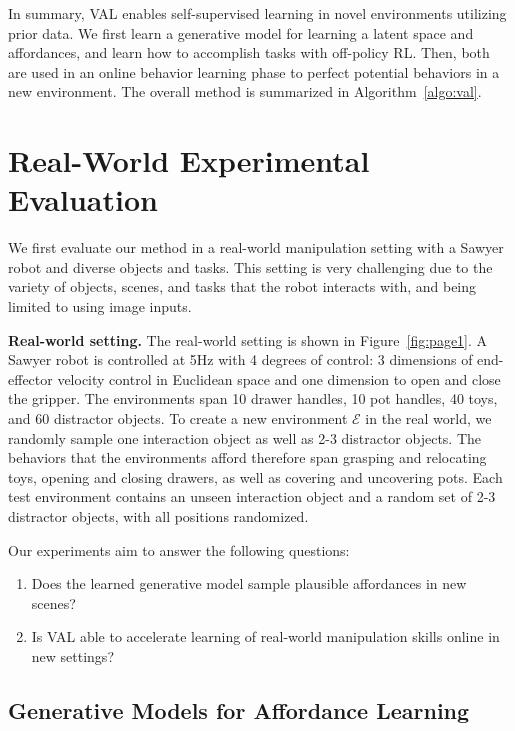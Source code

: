 \documentclass[letterpaper, 10 pt, conference]{ieeeconf}  %
\begin{document}
In summary, VAL enables self-supervised learning in novel environments utilizing prior data. 
We first learn a generative model for learning a latent space and affordances, and learn how to accomplish tasks with off-policy RL. 
Then, both are used in an online behavior learning phase to perfect potential behaviors in a new environment. 
The overall method is summarized in Algorithm~\ref{algo:val}.



\section{Real-World Experimental Evaluation}
\label{sec:result}

We first evaluate our method in a real-world manipulation setting with a Sawyer robot and diverse objects and tasks. This setting is very challenging due to the variety of objects, scenes, and tasks that the robot interacts with, and being limited to using image inputs.

\textbf{Real-world setting.} The real-world setting is shown in Figure~\ref{fig:page1}. A Sawyer robot is controlled at 5Hz with 4 degrees of control: 3 dimensions of end-effector velocity control in Euclidean space and one dimension to open and close the gripper. The environments span 10 drawer handles, 10 pot handles, 40 toys, and 60 distractor objects. To create a new environment $\mathcal{E}$ in the real world, we randomly sample one interaction object as well as 2-3 distractor objects. The behaviors that the environments afford therefore span grasping and relocating toys, opening and closing drawers, as well as covering and uncovering pots. Each test environment contains an unseen interaction object and a random set of 2-3 distractor objects, with all positions randomized.

Our experiments aim to answer the following questions:
\begin{enumerate}
    \item Does the learned generative model sample plausible affordances in new scenes?
    \item Is VAL able to accelerate learning of real-world manipulation skills online in new settings?
\end{enumerate}

\subsection{Generative Models for Affordance Learning}
\label{sec:gen_model_results}
\end{document}
